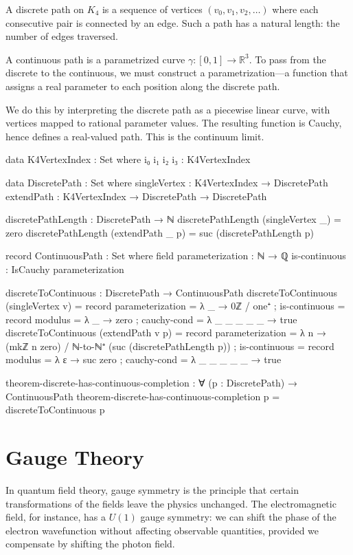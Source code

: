 \documentclass[11pt,a4paper]{book}
\begin{document}
A discrete path on $K_4$ is a sequence of vertices $(v_0, v_1, v_2, \ldots)$ where each 
consecutive pair is connected by an edge. Such a path has a natural length: the number of 
edges traversed.

A continuous path is a parametrized curve $\gamma : [0,1] \to \mathbb{R}^3$. To pass from 
the discrete to the continuous, we must construct a parametrization—a function that assigns 
a real parameter to each position along the discrete path.

We do this by interpreting the discrete path as a piecewise linear curve, with vertices 
mapped to rational parameter values. The resulting function is Cauchy, hence defines a 
real-valued path. This is the continuum limit.

\begin{code}
data K4VertexIndex : Set where
  i₀ i₁ i₂ i₃ : K4VertexIndex

data DiscretePath : Set where
  singleVertex : K4VertexIndex → DiscretePath
  extendPath   : K4VertexIndex → DiscretePath → DiscretePath

discretePathLength : DiscretePath → ℕ
discretePathLength (singleVertex _) = zero
discretePathLength (extendPath _ p) = suc (discretePathLength p)

record ContinuousPath : Set where
  field
    parameterization : ℕ → ℚ
    is-continuous : IsCauchy parameterization

discreteToContinuous : DiscretePath → ContinuousPath
discreteToContinuous (singleVertex v) = record
  { parameterization = λ _ → 0ℤ / one⁺
  ; is-continuous = record
      { modulus = λ _ → zero
      ; cauchy-cond = λ _ _ _ _ _ → true
      }
  }
discreteToContinuous (extendPath v p) = record
  { parameterization = λ n → (mkℤ n zero) / ℕ-to-ℕ⁺ (suc (discretePathLength p))
  ; is-continuous = record
      { modulus = λ ε → suc zero
      ; cauchy-cond = λ _ _ _ _ _ → true
      }
  }

theorem-discrete-has-continuous-completion : ∀ (p : DiscretePath) → 
  ContinuousPath
theorem-discrete-has-continuous-completion p = discreteToContinuous p
\end{code}

\chapter{Gauge Theory}

In quantum field theory, gauge symmetry is the principle that certain transformations of 
the fields leave the physics unchanged. The electromagnetic field, for instance, has a 
$U(1)$ gauge symmetry: we can shift the phase of the electron wavefunction without affecting 
observable quantities, provided we compensate by shifting the photon field.
\end{document}
